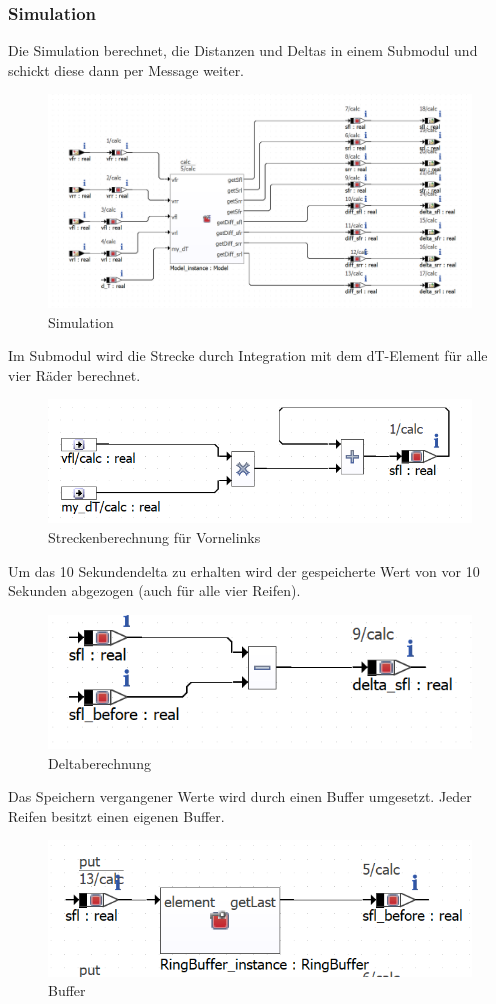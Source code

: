 \subsubsection{Simulation}
Die Simulation berechnet, die Distanzen und Deltas in einem Submodul und schickt diese dann per Message weiter.
\begin{figure}[H]
	\centering
\includegraphics[width=1\linewidth]{../Graphiken/ModelSim}
\caption{Simulation}
\label{fig:Sim1}
\end{figure}
Im Submodul wird die Strecke durch Integration mit dem dT-Element für alle vier Räder berechnet.
\begin{figure}[H]
	\centering
	\includegraphics[width=0.6\linewidth]{../Graphiken/integrate}
	\caption{Streckenberechnung für Vornelinks}
	\label{fig:Sim2}
\end{figure}
Um das 10 Sekundendelta zu erhalten wird der gespeicherte Wert von vor 10 Sekunden abgezogen (auch für alle vier Reifen).
\begin{figure}[H]
	\centering
	\includegraphics[width=0.5\linewidth]{../Graphiken/delta}
	\caption{Deltaberechnung}
	\label{fig:delta}
\end{figure}
Das Speichern vergangener Werte wird durch einen Buffer umgesetzt. Jeder Reifen besitzt einen eigenen Buffer.
\begin{figure}[H]
	\centering
	\includegraphics[width=0.6\linewidth]{../Graphiken/RinbufferApp}
	\caption{Buffer}
	\label{fig:Buffer}
\end{figure}
